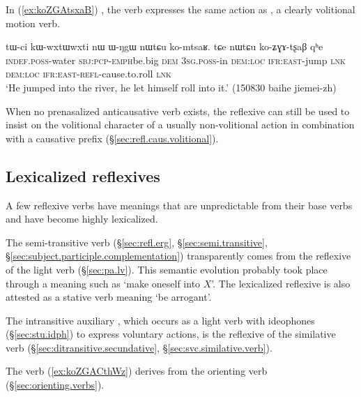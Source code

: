 In (\ref{ex:koZGAtsxaB}) , the verb  expresses the same action as , a clearly volitional motion verb.
 
\begin{exe}
\ex \label{ex:koZGAtsxaB}
\gll tɯ-ci kɯ-wxtɯ\redp{}wxti nɯ ɯ-ŋgɯ nɯtɕu ko-mtsaʁ. tɕe nɯtɕu ko-ʑɣɤ-tʂaβ qʰe     \\
\textsc{indef}.\textsc{poss}-water \textsc{sbj}:\textsc{pcp}-\textsc{emph}\redp{}be.big \textsc{dem} \textsc{3sg}.\textsc{poss}-in \textsc{dem}:\textsc{loc} \textsc{ifr}:\textsc{east}-jump \textsc{lnk} \textsc{dem}:\textsc{loc} \textsc{ifr}:\textsc{east}-\textsc{refl}-cause.to.roll \textsc{lnk}  \\
\glt `He jumped into the river, he let himself roll into it.' (150830 baihe jiemei-zh) 
 \end{exe}

When no prenasalized anticausative verb exists, the reflexive can still be used to insist on the volitional character of a usually non-volitional action in combination with a causative prefix (§\ref{sec:refl.caus.volitional}).

\subsection{Lexicalized reflexives} \label{sec:lexicalized.refl}
A few reflexive verbs have meanings that are unpredictable from their base verbs and have become highly lexicalized.

The semi-transitive verb  (§\ref{sec:refl.erg}, §\ref{sec:semi.transitive}, §\ref{sec:subject.participle.complementation}) transparently comes from the reflexive of the light verb  (§\ref{sec:pa.lv}). This semantic evolution probably took place through a meaning such as `make oneself into $X$'. The lexicalized reflexive  is also attested as a stative verb meaning `be arrogant'.

The intransitive auxiliary , which occurs as a light verb with ideophones (§\ref{sec:stu.idph}) to express voluntary actions, is the reflexive of the similative verb  (§\ref{sec:ditransitive.secundative}, §\ref{sec:svc.similative.verb}).

The verb  (\ref{ex:koZGACthWz}) derives from the orienting verb  (§\ref{sec:orienting.verbs}).

